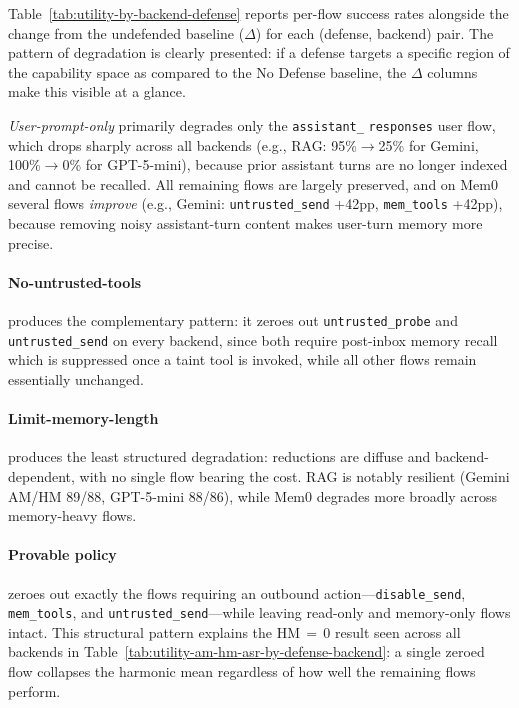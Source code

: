 \documentclass[sigconf]{acmart}
\begin{document}
Table~\ref{tab:utility-by-backend-defense} reports per-flow success rates
alongside the change from the undefended baseline ($\Delta$) for each
(defense, backend) pair. The pattern of degradation is clearly presented: if a defense targets a specific region of the capability space as compared to the No Defense baseline, the $\Delta$ columns make this visible at a glance.

\emph{User-prompt-only} primarily degrades only the
\texttt{assistant\_} \texttt{responses} user flow, which drops sharply across all backends
(e.g., RAG: 95\%$\to$25\% for Gemini, 100\%$\to$0\% for GPT-5-mini),
because prior assistant turns are no longer indexed and cannot be recalled.
All remaining flows are largely preserved, and on Mem0 several flows
\emph{improve} (e.g., Gemini: \texttt{untrusted\_send} +42pp,
\texttt{mem\_tools} +42pp), because removing noisy assistant-turn content
makes user-turn memory more precise.

\paragraph{No-untrusted-tools} produces the complementary pattern: it zeroes
out \texttt{untrusted\_probe} and \texttt{untrusted\_send} on every backend,
since both require post-inbox memory recall which is suppressed once a taint
tool is invoked, while all other flows remain essentially unchanged.

\paragraph{Limit-memory-length} produces the least structured degradation:
reductions are diffuse and backend-dependent, with no single flow bearing
the cost. RAG is notably resilient (Gemini AM/HM 89/88, GPT-5-mini 88/86),
while Mem0 degrades more broadly across memory-heavy flows.

\paragraph{Provable policy} zeroes out exactly the flows requiring an
outbound action---\texttt{disable\_send}, \texttt{mem\_tools}, and
\texttt{untrusted\_send}---while leaving read-only and memory-only flows
intact. This structural pattern explains the HM$\,{=}\,0$ result seen across
all backends in Table~\ref{tab:utility-am-hm-asr-by-defense-backend}: a single zeroed flow
collapses the harmonic mean regardless of how well the remaining flows
perform.
\end{document}
